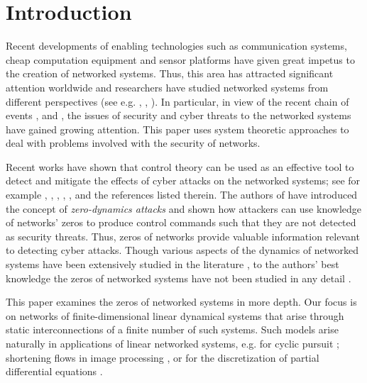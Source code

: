 \documentclass[twocolumn]{autart}    \usepackage{amsmath}
\begin{document}
\section{Introduction}\label{intro}
Recent developments of enabling technologies such as communication systems, cheap
computation equipment and sensor platforms have given great impetus to the creation
of  networked systems. Thus, this area has attracted significant
attention worldwide and researchers have studied networked systems from
different perspectives (see e.g. \cite{sinopoli2003distributed},
\cite{olfati2002distributed}, \cite{tanner2003stable}). In particular,
in view of the recent chain of events \cite{gorman2009electricity},
\cite{falliere2011w32} and \cite{rid2012cyber}, the issues of security and cyber
threats to the networked systems have gained  growing attention. This paper uses  system theoretic approaches  to deal with problems involved with the security of networks.

Recent works have shown that control theory can be used as an effective tool to detect and mitigate the effects of cyber  attacks on the networked systems;  see for example  \cite{sinapoli2012}, \cite{cardenas2011attacks}, \cite{gupta2010optimal}, \cite{amin:09}, \cite{govinndarasu}, \cite {Teixeira202} and the references listed therein. The authors of   \cite {Teixeira202} have introduced the concept of \textit{ zero-dynamics attacks}
and  shown how attackers can use knowledge of networks' zeros
to produce control commands such that they are not detected as security threats. Thus,  zeros of networks provide valuable
information relevant to detecting cyber attacks. Though  various aspects of the dynamics of networked systems have been extensively
studied in the literature \cite{Ren2007,Olfati2007,fax2004}, to the authors' best knowledge
the zeros of networked systems have not been studied in any detail \cite{zamanihlemke2013}.

This paper  examines  the zeros of networked systems in more depth. Our focus is on networks of finite-dimensional linear
dynamical systems that arise through static interconnections of a finite number of
such systems. Such models arise naturally in  applications
of linear  networked systems, e.g. for cyclic pursuit \cite{MarshallBrouckeFrancis};
 shortening flows in image processing \cite{Bruckstein}, or for the
 discretization of partial differential equations
 \cite{brockett-willems}.
\end{document}
